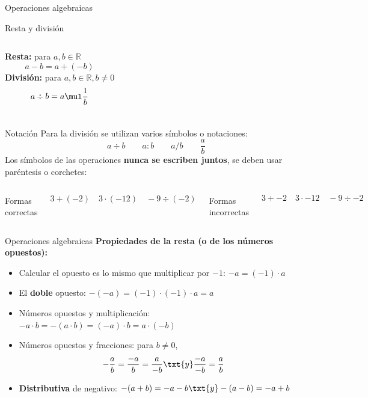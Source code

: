 \documentclass[9pt, aspectratio=169]{beamer}
\begin{document}
\begin{frame}{Operaciones algebraicas}
    \begin{block}{Resta y división}
        \vspace{0.3em}
        \begin{columns}
            \textbf{Resta:} para $a, b \in \mathbb{R}$
            \[ a - b = a + (-b) \]
            \textbf{División:} para $a, b \in \mathbb{R}, b \neq 0$
            \[ a \div b = a \mul \frac{1}{b} \]
        \end{columns}
    \end{block}

    \begin{block}{Notación}
Para la división se utilizan varios símbolos o notaciones:
\[ a \div b \qquad a : b \qquad a/b \qquad \frac{a}{b} \]
Los símbolos de las operaciones \textbf{nunca se escriben juntos}, se deben usar paréntesis o corchetes:
\begin{columns}[t]
    \begin{center}
        Formas correctas
    \end{center}
    \[ 3 +(-2) \quad 3 \cdot(-12) \quad -9 \div(-2) \]
    \begin{center}
        Formas incorrectas
    \end{center}
    \[ 3 + -2 \quad 3 \cdot -12  \quad -9 \div -2 \]
\end{columns}
    \end{block}
\end{frame}

\begin{frame}{Operaciones algebraicas}
    \textbf{Propiedades de la resta (o de los números opuestos):}
    \begin{itemize}
        \item Calcular el opuesto es lo mismo que multiplicar por $-1$: $-a = (-1) \cdot a$
        \item El \textbf{doble} opuesto: $-(-a) = (-1) \cdot (-1) \cdot a = a$
        \item Números opuestos y multiplicación: $-a \cdot b = -(a \cdot b) = (-a) \cdot b = a \cdot (-b)$
        \item Números opuestos y fracciones: para $b \neq 0$, 
            \[ -\frac{a}{b} = \frac{-a}{b} = \frac{a}{-b} \txt{y} \frac{-a}{-b} = \frac{a}{b} \]
        \item \textbf{Distributiva} de negativo: $-(a + b) = -a - b \txt{y} -(a - b) = -a + b$
    \end{itemize}
\end{frame}
\end{document}

